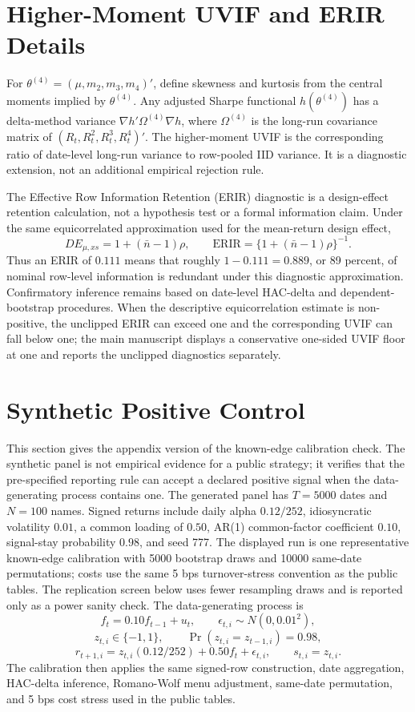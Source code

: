 \documentclass[12pt,a4paper]{article}
\begin{document}
\section{Higher-Moment UVIF and ERIR Details}

For \(\theta^{(4)}=(\mu,m_2,m_3,m_4)'\), define skewness and kurtosis
from the central moments implied by \(\theta^{(4)}\).  Any adjusted
Sharpe functional \(h(\theta^{(4)})\) has a delta-method variance
\(\nabla h'\Omega^{(4)}\nabla h\), where \(\Omega^{(4)}\) is the
long-run covariance matrix of \((R_t,R_t^2,R_t^3,R_t^4)'\).  The
higher-moment UVIF is the corresponding ratio of date-level long-run
variance to row-pooled IID variance.  It is a diagnostic extension, not
an additional empirical rejection rule.

The Effective Row Information Retention (ERIR) diagnostic is a
design-effect retention calculation, not a hypothesis test or a formal
information claim.  Under the same equicorrelated approximation
used for the mean-return design effect,
\[
  DE_{\mu,xs}=1+(\bar n-1)\rho,
  \qquad
  \mathrm{ERIR}=\{1+(\bar n-1)\rho\}^{-1}.
\]
Thus an ERIR of \(0.111\) means that roughly \(1-0.111=0.889\), or 89
percent, of nominal row-level information is redundant under this
diagnostic approximation.  Confirmatory inference remains based on
date-level HAC-delta and dependent-bootstrap procedures.  When the
descriptive equicorrelation estimate is non-positive, the unclipped ERIR
can exceed one and the corresponding UVIF can fall below one; the main
manuscript displays a conservative one-sided UVIF floor at one and
reports the unclipped diagnostics separately.

\section{Synthetic Positive Control}

This section gives the appendix version of the known-edge calibration
check.  The synthetic panel is not empirical evidence for a public
strategy; it verifies that the pre-specified reporting rule can
accept a declared positive signal when the data-generating process
contains one.
The generated panel has \(T=5000\) dates and \(N=100\) names.  Signed
returns include daily alpha \(0.12/252\), idiosyncratic volatility
\(0.01\), a common loading of \(0.50\), AR(1) common-factor coefficient
\(0.10\), signal-stay probability \(0.98\), and seed 777.  The displayed
run is one representative known-edge calibration with 5000 bootstrap
draws and 10000 same-date permutations; costs use the same 5 bps
turnover-stress convention as the public tables.  The replication
screen below uses fewer resampling draws and is reported only as a power
sanity check.
The data-generating process is
\[
  f_t = 0.10 f_{t-1}+u_t,\qquad
  \epsilon_{t,i}\sim N(0,0.01^2),
\]
\[
  z_{t,i}\in\{-1,1\},\qquad
  \Pr(z_{t,i}=z_{t-1,i})=0.98,
\]
\[
  r_{t+1,i}=z_{t,i}(0.12/252)+0.50 f_t+\epsilon_{t,i},
  \qquad s_{t,i}=z_{t,i}.
\]
The calibration then applies the same signed-row construction, date
aggregation, HAC-delta inference, Romano-Wolf menu adjustment,
same-date permutation, and 5 bps cost stress used in the public tables.
\end{document}
